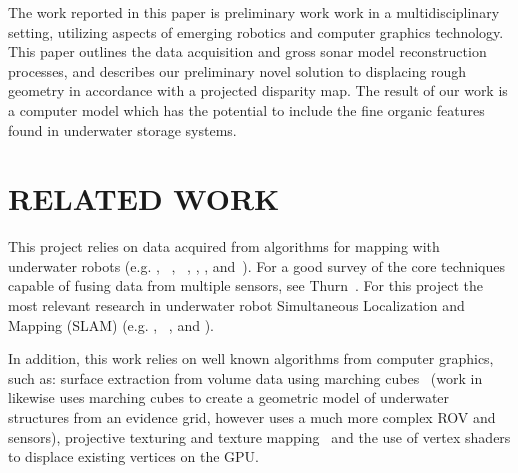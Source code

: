 \documentclass[a4paper,twoside]{article}
\begin{document}

The work reported in this paper is preliminary work work in a multidisciplinary setting, utilizing aspects of emerging robotics and computer graphics technology.  This paper outlines the data acquisition and gross sonar model reconstruction processes, and describes our preliminary novel solution to displacing rough geometry in accordance with a projected disparity map. The result of our work is a computer model which has the potential to include the fine organic features found in underwater storage systems.

\section{\uppercase{Related Work}}
\label{sec:data}

This project relies on data acquired from algorithms for mapping with underwater robots (e.g. \cite{Williams2000}, ~\cite{Williams09}, ~\cite{opizarro-2009a}, \cite{Fairfield2005,Fairfield2006}, \cite{Clark2008b}, and~\cite{White10}). For a good survey of the core techniques capable of fusing data from multiple sensors, see Thurn~\cite{Thrun2005}.
For this project the most relevant  research in underwater robot Simultaneous Localization and Mapping (SLAM) (e.g. \cite{Williams2000}, ~\cite{harbor}, and \cite{Fairfield2005,Fairfield2006}).  

In addition, this work relies on well known algorithms from computer graphics, such as: surface extraction from volume data using marching cubes~\cite{Lorensen} (work in ~\cite{Fairfield:2010} likewise uses marching cubes to create a geometric model of underwater structures from an evidence grid, however uses a much more complex ROV and sensors), projective texturing and texture mapping~\cite{Williams78castingcurved,Segal} and the use of vertex shaders to displace existing vertices on the GPU.
\end{document}
